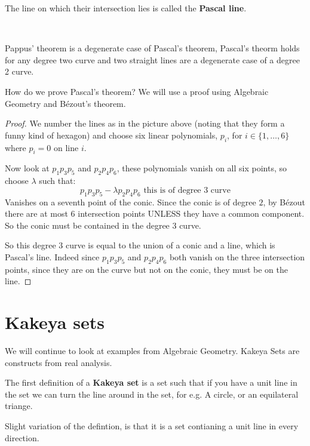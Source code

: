 The line on which their intersection lies is called the \textbf{Pascal line}.

\

Pappus' theorem is a degenerate case of Pascal's theorem, Pascal's theorm holds for any degree two curve and two straight lines are a degenerate case of a degree 2 curve.

How do we prove Pascal's theorem? We will use a proof using Algebraic Geometry and Bézout's theorem. 

\begin{proof}
    We number the lines as in the picture above (noting that they form a funny kind of hexagon) and choose six linear polynomials, 
    $p_i$, for $i\in \{1,\dots, 6\}$ where $p_i = 0$ on line $i$.

    Now look at $p_1p_3p_5$ and $p_2p_4p_6$, these polynomials vanish on all six points, so choose $\lambda$ such that:\begin{equation}
        p_1p_3p_5 - \lambda p_2p_4p_6 \text{ this is of degree 3 curve}
    \end{equation}
    Vanishes on a seventh point of the conic. Since the conic is of degree $2$, by Bézout there are at most $6$ intersection points 
    UNLESS they have a common component. So the conic must be contained in the degree $3$ curve.

    So this degree $3$ curve is equal to the union of a conic and a line, which is Pascal's line. Indeed since $p_1p_3p_5$ and $p_2p_4p_6$ both vanish on the 
    three intersection points, since they are on the curve but not on the conic, they must be on the line.
\end{proof}

\section{Kakeya sets}

We will continue to look at examples from Algebraic Geometry. Kakeya Sets are constructs from real analysis.

\begin{definition}
    The first definition of a \textbf{Kakeya set} is a set such that if you have a unit line in the set we can turn the line around
    in the set, for e.g. A circle, or an equilateral triange.

    Slight variation of the defintion, is that it is a set contianing a unit line in every direction.
\end{definition}

